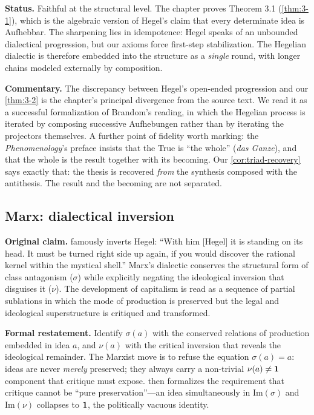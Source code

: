 \textbf{Status.} Faithful at the structural level. The chapter
proves Theorem 3.1 (\cref{thm:3-1}), which is the algebraic version
of Hegel's claim that every determinate idea is Aufhebbar. The
sharpening lies in idempotence: Hegel speaks of an unbounded
dialectical progression, but our axioms force first-step
stabilization. The Hegelian dialectic is therefore embedded into
the structure as a \emph{single} round, with longer chains modeled
externally by composition.

\textbf{Commentary.} The discrepancy between Hegel's open-ended
progression and our \cref{thm:3-2} is the chapter's principal
divergence from the source text. We read it as a successful
formalization of Brandom's \citep{Brandom1994} reading, in which the
Hegelian process is iterated by composing successive Aufhebungen
rather than by iterating the projectors themselves.  A further point
of fidelity worth marking: the \emph{Phenomenology}'s preface
\citep[\S20]{Hegel1807} insists that the True is ``the whole''
(\emph{das Ganze}), and that the whole is the result together
with its becoming. Our \cref{cor:triad-recovery} says exactly that:
the thesis is recovered \emph{from} the synthesis composed with the
antithesis. The result and the becoming are not separated.

\subsection*{Marx: dialectical inversion}

\textbf{Original claim.} \citet{Marx1867} famously inverts Hegel:
``With him [Hegel] it is standing on its head. It must be turned
right side up again, if you would discover the rational kernel within
the mystical shell.'' Marx's dialectic conserves the structural form
of class antagonism ($\sigma$) while explicitly negating the
ideological inversion that disguises it ($\nu$). The development of
capitalism is read as a sequence of partial sublations in which the
mode of production is preserved but the legal and ideological
superstructure is critiqued and transformed.

\textbf{Formal restatement.} Identify $\sigma(a)$ with the conserved
relations of production embedded in idea $a$, and $\nu(a)$ with the
critical inversion that reveals the ideological remainder. The Marxist
move is to refuse the equation
$\sigma(a)=a$: ideas are never \emph{merely} preserved; they always
carry a non-trivial $\nu(a)\neq\mathbf{1}$ component that critique must
expose.  then formalizes the requirement
that critique cannot be ``pure preservation''---an idea simultaneously
in $\mathrm{Im}(\sigma)$ and $\mathrm{Im}(\nu)$ collapses to $\mathbf{1}$,
the politically vacuous identity.

